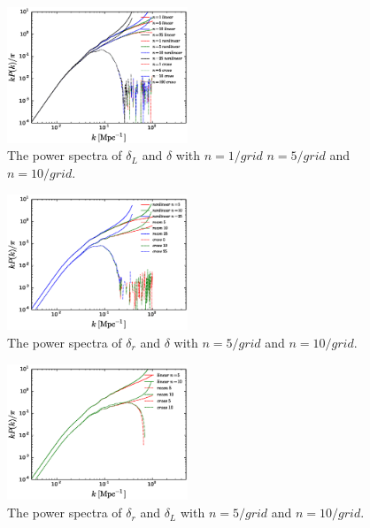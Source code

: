 \documentclass[aps,prd,twocolumn,showpacs,superscriptaddress,groupedaddress,nofootinbib]{revtex4}  %
\begin{document}
\begin{figure}[tbp]
\begin{center}
\includegraphics[width=0.48\textwidth]{f7.eps}
\end{center}
\vspace{-0.7cm}
\caption{The power spectra of $\delta_L$ and $\delta$ with $n=1/grid$ $n=5/grid$
and $n=10/grid$.}
\label{fig:ps7}
\end{figure}

\begin{figure}[tbp]
\begin{center}
\includegraphics[width=0.48\textwidth]{f6.eps}
\end{center}
\vspace{-0.7cm}
\caption{The power spectra of $\delta_r$ and $\delta$ with $n=5/grid$
and $n=10/grid$.}
\label{fig:ps6}
\end{figure}

\begin{figure}[tbp]
\begin{center}
\includegraphics[width=0.48\textwidth]{f8.eps}
\end{center}
\vspace{-0.7cm}
\caption{The power spectra of $\delta_r$ and $\delta_L$ with $n=5/grid$
and $n=10/grid$.}
\label{fig:ps8}
\end{figure}
\end{document}
